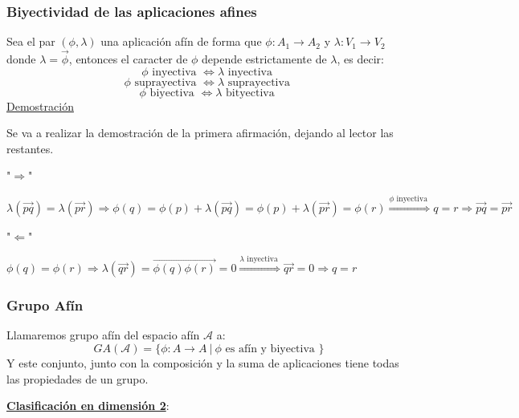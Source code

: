 \documentclass[10pt,a4paper,openright]{book}
\begin{document}
\subsubsection*{Biyectividad de las aplicaciones afines}
Sea el par $(\phi, \lambda)$ una aplicación afín de forma que $\phi: A_1 \to A_2$ y $\lambda: V_1 \to V_2$ donde $\lambda = \vec{\phi}$, entonces el caracter de $\phi$ depende estrictamente de $\lambda$, es decir:
$$\phi \mbox{ inyectiva } \Leftrightarrow \lambda \mbox{ inyectiva } $$
$$\phi \mbox{ suprayectiva } \Leftrightarrow \lambda \mbox{ suprayectiva } $$
$$\phi \mbox{ biyectiva } \Leftrightarrow \lambda \mbox{ bityectiva } $$
\underline{Demostración}

Se va a realizar la demostración de la primera afirmación, dejando al lector las restantes.

"$\Rightarrow$"

$\lambda (\vec{pq}) = \lambda (\vec{pr}) \Rightarrow  \phi(q) = \phi(p) + \lambda(\vec{pq}) = \phi(p) + \lambda(\vec{pr}) = \phi(r) \overset{\phi \mbox{ inyectiva }}{\Rightarrow} q = r \Rightarrow \vec{pq} = \vec{pr}$

"$\Leftarrow$"

$\phi(q) = \phi(r) \Rightarrow \lambda (\vec{qr}) = \overrightarrow{\phi(q) \phi(r)} = 0 \overset{\lambda \mbox{ inyectiva }}{\Rightarrow} \vec{qr} = 0 \Rightarrow q = r$


\subsubsection*{Grupo Afín}
Llamaremos grupo afín del espacio afín $\mathcal{A}$ a:
$$GA(\mathcal{A}) = \{\phi : A \to A \ | \ \phi \mbox{ es afín y biyectiva }\}$$
Y este conjunto, junto con la composición y la suma de aplicaciones tiene todas las propiedades de un grupo.

\underline{\textbf{Clasificación en dimensión 2}}:
\end{document}
